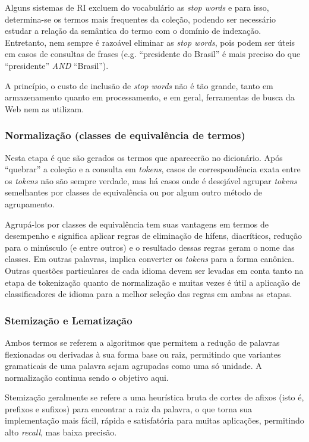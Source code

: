 Alguns sistemas de RI excluem do vocabulário as \emph{stop words} e para isso, determina-se os termos mais frequentes da coleção, podendo ser necessário estudar a relação da semântica do termo com o domínio de indexação. Entretanto, nem sempre é razoável eliminar as \emph{stop words}, pois podem ser úteis em casos de consultas de frases (e.g. ``presidente do Brasil'' é mais preciso do que ``presidente'' \emph{AND} ``Brasil'').

A princípio, o custo de inclusão de \emph{stop words} não é tão grande, tanto em armazenamento quanto em processamento, e em geral, ferramentas de busca da Web nem as utilizam.

\subsubsection{Normalização (classes de equivalência de termos)}

Nesta etapa é que são gerados os termos que aparecerão no dicionário. Após ``quebrar'' a coleção e a consulta em \emph{tokens}, casos de correspondência exata entre os \emph{tokens} não são sempre verdade, mas há casos onde é desejável agrupar \emph{tokens} semelhantes por classes de equivalência ou por algum outro método de agrupamento.

Agrupá-los por classes de equivalência tem suas vantagens em termos de desempenho e significa aplicar regras de eliminação de hífens, diacríticos, redução para o minúsculo (e entre outros) e o resultado dessas regras geram o nome das classes. Em outras palavras, implica converter os \emph{tokens} para a forma canônica. Outras questões particulares de cada idioma devem ser levadas em conta tanto na etapa de tokenização quanto de normalização e muitas vezes é útil a aplicação de classificadores de idioma para a melhor seleção das regras em ambas as etapas.

\subsubsection{Stemização e Lematização}

Ambos termos se referem a algoritmos que permitem a redução de palavras flexionadas ou derivadas à sua forma base ou raiz, permitindo que variantes gramaticais de uma palavra sejam agrupadas como uma só unidade. A normalização continua sendo o objetivo aqui.

Stemização geralmente se refere a uma heurística bruta de cortes de afixos (isto é, prefixos e sufixos) para encontrar a raiz da palavra, o que torna sua implementação mais fácil, rápida e satisfatória para muitas aplicações, permitindo alto \emph{recall}, mas baixa precisão.

